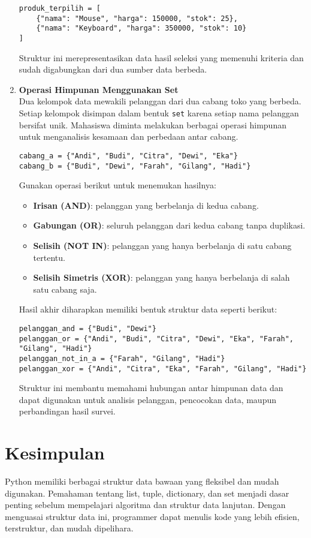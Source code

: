 \begin{enumerate}
\begin{lstlisting}[style=PythonStyle]
produk_terpilih = [
    {"nama": "Mouse", "harga": 150000, "stok": 25},
    {"nama": "Keyboard", "harga": 350000, "stok": 10}
]
\end{lstlisting}

Struktur ini merepresentasikan data hasil seleksi yang memenuhi kriteria dan sudah digabungkan dari dua sumber data berbeda.


\item \textbf{Operasi Himpunan Menggunakan Set} \\
Dua kelompok data mewakili pelanggan dari dua cabang toko yang berbeda. 
Setiap kelompok disimpan dalam bentuk \texttt{set} karena setiap nama pelanggan bersifat unik.  
Mahasiswa diminta melakukan berbagai operasi himpunan untuk menganalisis kesamaan dan perbedaan antar cabang.

\begin{lstlisting}[style=PythonStyle]
cabang_a = {"Andi", "Budi", "Citra", "Dewi", "Eka"}
cabang_b = {"Budi", "Dewi", "Farah", "Gilang", "Hadi"}
\end{lstlisting}

Gunakan operasi berikut untuk menemukan hasilnya:
\begin{itemize}
  \item \textbf{Irisan (AND)}: pelanggan yang berbelanja di kedua cabang.
  \item \textbf{Gabungan (OR)}: seluruh pelanggan dari kedua cabang tanpa duplikasi.
  \item \textbf{Selisih (NOT IN)}: pelanggan yang hanya berbelanja di satu cabang tertentu.
  \item \textbf{Selisih Simetris (XOR)}: pelanggan yang hanya berbelanja di salah satu cabang saja.
\end{itemize}

Hasil akhir diharapkan memiliki bentuk struktur data seperti berikut:

\begin{lstlisting}[style=PythonStyle]
pelanggan_and = {"Budi", "Dewi"}
pelanggan_or = {"Andi", "Budi", "Citra", "Dewi", "Eka", "Farah", "Gilang", "Hadi"}
pelanggan_not_in_a = {"Farah", "Gilang", "Hadi"}
pelanggan_xor = {"Andi", "Citra", "Eka", "Farah", "Gilang", "Hadi"}
\end{lstlisting}

Struktur ini membantu memahami hubungan antar himpunan data dan dapat digunakan untuk 
analisis pelanggan, pencocokan data, maupun perbandingan hasil survei.

\end{enumerate}

\section{Kesimpulan}
Python memiliki berbagai struktur data bawaan yang fleksibel dan mudah digunakan.
Pemahaman tentang list, tuple, dictionary, dan set menjadi dasar penting sebelum mempelajari algoritma dan struktur data lanjutan.
Dengan menguasai struktur data ini, programmer dapat menulis kode yang lebih efisien, terstruktur, dan mudah dipelihara.
